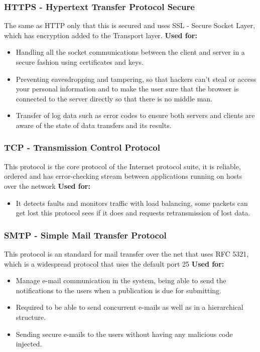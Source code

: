 \documentclass[a4paper]{article}
\begin{document}
	
	\subsubsection{HTTPS - Hypertext Transfer Protocol Secure}
	The same as HTTP only that this is secured and uses SSL - Secure Socket Layer, which has encryption added to the Transport layer. 
	\textbf{Used for:	}
	\begin{itemize}
		\item{Handling all the socket communications between the client and server in a secure fashion using certificates and keys.}
		\item{Preventing eavesdropping and tampering, so that hackers can't steal or access your personal information and to make the user sure that the browser is connected to the server directly so that there is no middle man.}
		\item{Transfer of log data such as error codes to ensure both servers and clients are aware of the state of data transfers and its results.}
	\end{itemize}
	\subsubsection{TCP - Transmission Control Protocol}
	This protocol is the core protocol of the Internet protocol  suite, it is reliable, ordered and has error-checking stream between applications running on hosts over the network
	\textbf{Used for:	}
	\begin{itemize}
		\item{It detects faults and monitors traffic with load balancing, some packets can get lost this protocol sees if it does and requests retransmission of lost data.}
	\end{itemize}
	\subsubsection{SMTP - Simple Mail Transfer Protocol}
	This protocol is an standard for mail transfer over the net that uses RFC 5321, which is a widespread protocol that uses the default port 25
	\textbf{Used for:	}
	\begin{itemize}
		\item{Manage e-mail communication in the system, being able to send the notifications to the users when a publication is due for submitting.}
		\item{Required to be able to send concurrent e-mails as well as in a hierarchical structure.}
		\item{Sending secure e-mails to the users without having any malicious code injected.}
	\end{itemize}
	
\end{document}
